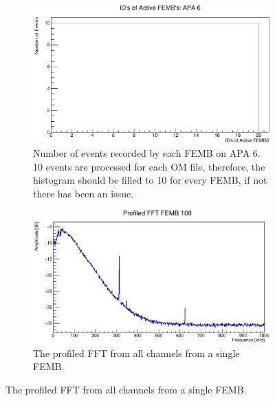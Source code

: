 \begin{figure}

	\centering

	\begin{subfigure}[b]{0.73\textwidth}
		\centering
		\includegraphics[width=\textwidth]{figures/active_femb.pdf}
		\caption {Number of events recorded by each FEMB on APA 6. 10 events are
		processed for each OM file, therefore, the histogram should be filled to 10
		for every FEMB, if not there has been an issue.}
		\label{fig:active_femb}
	\end{subfigure}

	\begin{subfigure}[b]{0.73\textwidth}
		\centering
		\vspace{3mm}
		\includegraphics[width=\textwidth]{figures/tpc_fft.pdf}
		\caption {The profiled FFT from all channels from a single FEMB.}
		\label{fig:TPC_FFT}
	\end{subfigure}


\end{figure}
